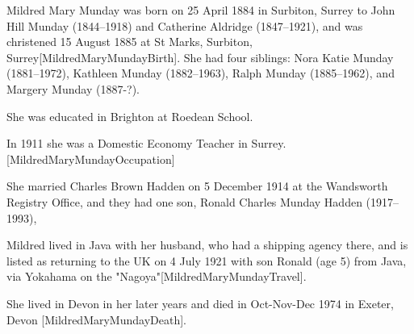 
Mildred Mary Munday was born on 25 April 1884 in Surbiton, Surrey to  John Hill Munday (1844--1918) and Catherine Aldridge (1847--1921), and was christened 15 August 1885 at St Marks, Surbiton, Surrey[MildredMaryMundayBirth]. She had four siblings:  Nora Katie Munday (1881--1972),  Kathleen Munday (1882--1963), Ralph Munday (1885--1962), and Margery Munday (1887-?).

She was educated in Brighton at Roedean School.

In 1911 she was a Domestic Economy Teacher in Surrey. [MildredMaryMundayOccupation]

She married Charles Brown Hadden on	5 December 1914  at the	Wandsworth Registry Office, and they had one son,  Ronald Charles Munday Hadden (1917--1993),

Mildred lived in Java with her husband, who had a shipping agency there, and is listed as returning to the UK on 4 July 1921 with son Ronald (age 5) from Java, via Yokahama on the "Nagoya"[MildredMaryMundayTravel].

She lived in Devon in her later years and died in Oct-Nov-Dec 1974 in	Exeter, Devon [MildredMaryMundayDeath].
